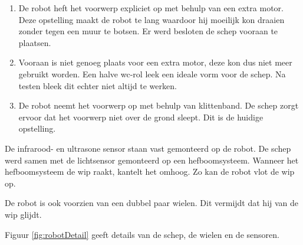 \documentclass[tt2]{penoverslag}
\begin{document}
\begin{enumerate}
\item De robot heft het voorwerp expliciet op met behulp van een extra motor. Deze opstelling maakt de robot te lang waardoor hij moeilijk kon draaien zonder tegen een muur te botsen. Er werd besloten de schep vooraan te plaatsen.
\item Vooraan is niet genoeg plaats voor een extra motor, deze kon dus niet meer gebruikt worden. Een halve wc-rol leek een ideale vorm voor de schep. Na testen bleek dit echter niet altijd te werken.
\item De robot neemt het voorwerp op met behulp van klittenband. De schep zorgt ervoor dat het voorwerp niet over de grond sleept. Dit is de huidige opstelling.
\end{enumerate}

De infrarood- en ultrasone sensor staan vast gemonteerd op de robot. De schep werd samen met de lichtsensor gemonteerd op een hefboomsysteem. Wanneer het hefboomsysteem de wip raakt, kantelt het omhoog. Zo kan de robot vlot de wip op.

De robot is ook voorzien van een dubbel paar wielen. Dit vermijdt dat hij van de wip glijdt.

Figuur \ref{fig:robotDetail} geeft details van de schep, de wielen en de sensoren.
\end{document}
